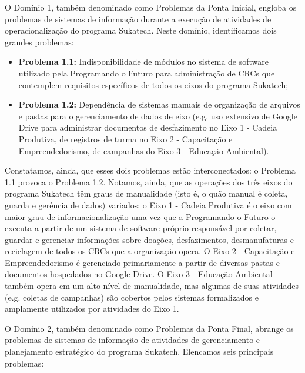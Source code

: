 \documentclass[
	12pt,				%
	openright,			%
	twoside,			%
	a4paper,			%
	english,			%
	french,				%
	spanish,			%
	brazil,				%
	]{abntex2}
\begin{document}
O Domínio 1, também denominado como Problemas da Ponta Inicial, engloba os problemas de sistemas de informação durante a execução de atividades de operacionalização do programa Sukatech. Neste domínio, identificamos dois grandes problemas:

\begin{itemize}
  \item \textbf{Problema 1.1:} Indisponibilidade de módulos no sistema de software utilizado pela Programando o Futuro para administração de CRCs que contemplem requisitos específicos de todos os eixos do programa Sukatech;
  \item \textbf{Problema 1.2:} Dependência de sistemas manuais de organização de arquivos e pastas para o gerenciamento de dados de eixo (e.g. uso extensivo de Google Drive para administrar documentos de desfazimento no Eixo 1 - Cadeia Produtiva, de registros de turma no Eixo 2 - Capacitação e Empreendedorismo, de campanhas do Eixo 3 - Educação Ambiental).
\end{itemize}

Constatamos, ainda, que esses dois problemas estão interconectados: o Problema 1.1 provoca o Problema 1.2. Notamos, ainda, que as operações dos três eixos do programa Sukatech têm graus de manualidade (isto é, o quão manual é coleta, guarda e gerência de dados) variados: o Eixo 1 - Cadeia Produtiva é o eixo com maior grau de informacionalização uma vez que a Programando o Futuro o executa a partir de um sistema de software próprio responsável por coletar, guardar e gerenciar informações sobre doações, desfazimentos, desmanufaturas e reciclagem de todos os CRCs que a organização opera. O Eixo 2 - Capacitação e Empreendedorismo é gerenciado primariamente a partir de diversas pastas e documentos hospedados no Google Drive. O Eixo 3 - Educação Ambiental também opera em um alto nível de manualidade, mas algumas de suas atividades (e.g. coletas de campanhas) são cobertos pelos sistemas formalizados e amplamente utilizados por atividades do Eixo 1.

O Domínio 2, também denominado como Problemas da Ponta Final, abrange os problemas de sistemas de informação de atividades de gerenciamento e planejamento estratégico do programa Sukatech. Elencamos seis principais problemas:
\end{document}
